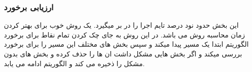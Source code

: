 \subsubsection{ارزیابی برخورد}
این بخش حدود نود درصد تایم اجرا را در بر میگیرد. یک روش خوب برای بهتر کردن زمان محاسبه روش
 می باشد. در این روش به جای چک کردن تمام نقاط برای برخورد الگوریتم ابتدا یک مسیر پیدا میکند و سپس بخش های مختلف این مسیر را برای برخورد بررسی میکند و اگر بخش هایی مشکل داشت ان ها را حذف کرده و بخش های بدون مشکل را ذخیره می کند و الگوریتم ادامه می یابد.

